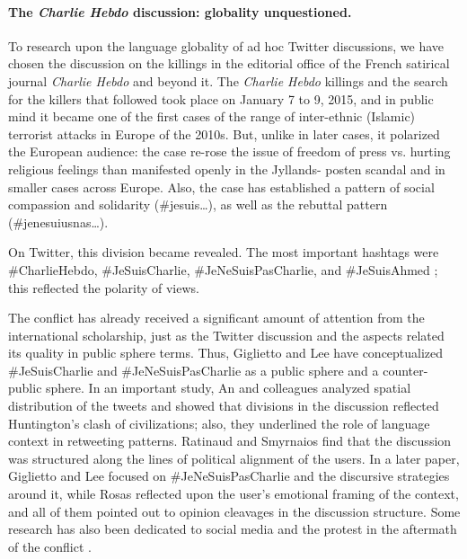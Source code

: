 \paragraph{The \textit{Charlie Hebdo} discussion: globality unquestioned.} To research upon the language globality of ad hoc Twitter discussions, we have chosen the discussion on the killings in the editorial office of the French satirical journal \textit{Charlie Hebdo} and beyond it. The \textit{Charlie Hebdo} killings and the search for the killers that followed took place on January 7 to 9, 2015, and in public mind it became one of the first cases of the range of inter-ethnic (Islamic) terrorist attacks in Europe of the 2010s. But, unlike in later cases, it polarized the European audience: the case re-rose the issue of freedom of press vs. hurting religious feelings than manifested openly in the Jyllands- posten scandal and in smaller cases across Europe. Also, the case has established a pattern of social compassion and solidarity (\#jesuis…), as well as the rebuttal pattern (\#jenesuiusnas…).

On Twitter, this division became revealed. The most important hashtags were \#CharlieHebdo, \#JeSuisCharlie, \#JeNeSuisPasCharlie, and \#JeSuisAhmed \cite{AnKwakMejova}; this reflected the polarity of views.

The conflict has already received a significant amount of attention from the international scholarship, just as the Twitter discussion and the aspects related its quality in public sphere terms. Thus, Giglietto and Lee \cite{GigliettoLee} have conceptualized \#JeSuisCharlie and \#JeNeSuisPasCharlie as a public sphere and a counter-public sphere. In an important study, An and colleagues \cite{AnKwakMejova} analyzed spatial distribution of the tweets and showed that divisions in the discussion reflected Huntington’s clash of civilizations; also, they underlined the role of language context in retweeting patterns. Ratinaud and Smyrnaios \cite{RatinaudSmyrnaios} find that the discussion was structured along the lines of political alignment of the users. In a later paper, Giglietto and Lee \cite{GigliettoLee2017} focused on \#JeNeSuisPasCharlie and the discursive strategies around it, while Rosas \cite{Rosas} reflected upon the user’s emotional framing of the context, and all of them pointed out to opinion cleavages in the discussion structure. Some research has also been dedicated to social media and the protest in the aftermath of the conflict \cite{LarsonNaglerRonen,MayerTiberj,Salovaara}.

